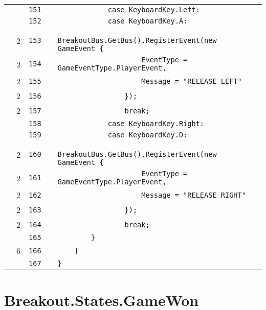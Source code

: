 \documentclass[a4paper,landscape,10pt]{article}
\begin{document}
\begin{longtable}[l]{lrrll}
\cellcolor{gray} &  & \verb~151~ & & \verb~            case KeyboardKey.Left:~\\
\cellcolor{gray} &  & \verb~152~ & & \verb~            case KeyboardKey.A:~\\
\cellcolor{green} & 2 & \verb~153~ & & \verb~                BreakoutBus.GetBus().RegisterEvent(new GameEvent {~\\
\cellcolor{green} & 2 & \verb~154~ & & \verb~                    EventType = GameEventType.PlayerEvent,~\\
\cellcolor{green} & 2 & \verb~155~ & & \verb~                    Message = "RELEASE LEFT"~\\
\cellcolor{green} & 2 & \verb~156~ & & \verb~                });~\\
\cellcolor{green} & 2 & \verb~157~ & & \verb~                break;~\\
\cellcolor{gray} &  & \verb~158~ & & \verb~            case KeyboardKey.Right:~\\
\cellcolor{gray} &  & \verb~159~ & & \verb~            case KeyboardKey.D:~\\
\cellcolor{green} & 2 & \verb~160~ & & \verb~                BreakoutBus.GetBus().RegisterEvent(new GameEvent {~\\
\cellcolor{green} & 2 & \verb~161~ & & \verb~                    EventType = GameEventType.PlayerEvent,~\\
\cellcolor{green} & 2 & \verb~162~ & & \verb~                    Message = "RELEASE RIGHT"~\\
\cellcolor{green} & 2 & \verb~163~ & & \verb~                });~\\
\cellcolor{green} & 2 & \verb~164~ & & \verb~                break;~\\
\cellcolor{gray} &  & \verb~165~ & & \verb~        }~\\
\cellcolor{green} & 6 & \verb~166~ & & \verb~    }~\\
\cellcolor{gray} &  & \verb~167~ & & \verb~}~\\
\end{longtable}
\newpage
\section{Breakout.States.GameWon}
\end{document}
